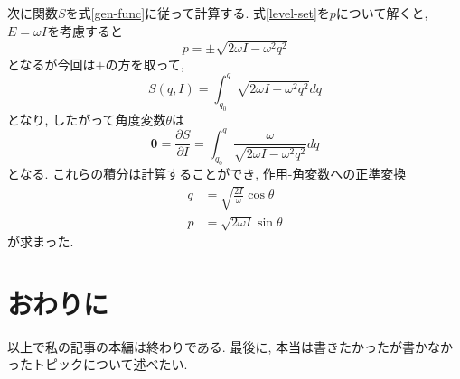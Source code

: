 \documentclass{ltjsarticle}
\theoremstyle{definition}
\numberwithin{thm}{section}
\theoremstyle{definition}
\numberwithin{prop}{section}
\theoremstyle{definition}
\numberwithin{dfn}{section}
\numberwithin{equation}{section}
\begin{document}
次に関数$S$を式\ref{gen-func}に従って計算する. 式\ref{level-set}を$p$について解くと, $E=\omega I$を考慮すると
\begin{equation*}
    p=\pm\sqrt{2\omega I-\omega^2q^2}
\end{equation*}
となるが今回は$+$の方を取って,
\begin{equation}
    S(q,I)=\int_{q_0}^{q} \sqrt{2\omega I-\omega^2q^2}dq
\end{equation}
となり, したがって角度変数$\theta$は
\begin{equation}
    \bm{\theta}=\frac{\partial S}{\partial I}=\int_{q_0}^{q} \frac{\omega}{\sqrt{2\omega I-\omega^2q^2}}dq
\end{equation}
となる. これらの積分は計算することができ, 作用-角変数への正準変換
\begin{equation}
    \begin{aligned}
        q&=\sqrt{\frac{2I}{\omega}}\cos{\theta}\\
        p&=\sqrt{2\omega I}\sin{\theta}
    \end{aligned}
\end{equation}
が求まった.
\section{おわりに}
以上で私の記事の本編は終わりである. 最後に, 本当は書きたかったが書かなかったトピックについて述べたい.
\end{document}
